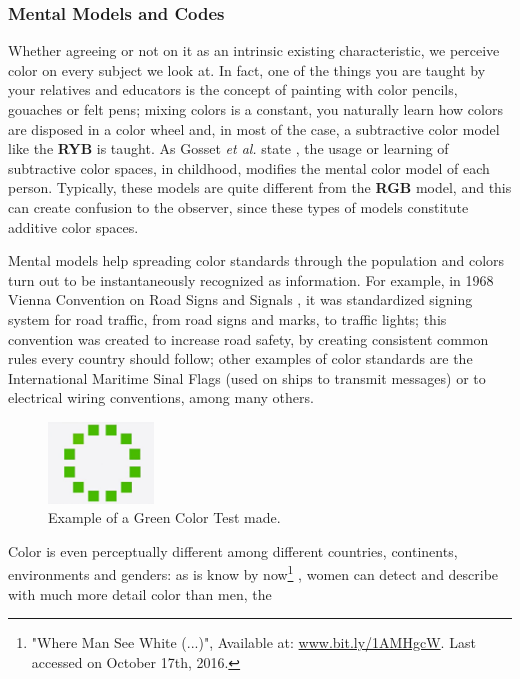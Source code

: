 \subsubsection{Mental Models and Codes}
Whether agreeing or not on it as an intrinsic existing characteristic, we perceive color on every
subject we look at. In fact, one of the things you are taught by your relatives and educators is the concept of
painting with color pencils, gouaches or felt pens; mixing colors is a constant,
you naturally learn how colors are disposed in a color wheel and, in most of the case, a subtractive color
model like the \textbf{RYB} is taught. As Gosset \emph{et al.} state \cite{Gossett2004}, the usage or learning of
subtractive color spaces, in childhood, modifies the mental color model of each person. Typically, these models are quite
different from the \textbf{RGB} model, and this can create confusion to
the observer, since these types of models constitute additive color spaces. \par
Mental models help spreading color standards through the population and colors turn out to be instantaneously
recognized as information. For example, in 1968 Vienna Convention on Road Signs and Signals \cite{Nations1995}, it was standardized signing system for road traffic, from road signs and marks, to traffic lights;
this convention was created to increase road safety, by creating consistent common rules every country
should follow; other examples of color standards are the International Maritime Sinal Flags
\cite{Agency2003} (used on ships to transmit messages) or to electrical wiring conventions, among many others. \par
%
\begin{figure}
	\centering
    \vspace{-10pt}
    \includegraphics[width=0.25\textwidth]{images/background/Himba_green-color-ring.jpg}
    \caption[Himba Test: Green Color Ring]{Example of a Green Color Test made.\protect\footnotemark[8]}
    \label{fig:himba}
\end{figure}
%
Color is even perceptually different among different countries, continents, environments and genders:
as is know by now\footnote{"Where Man See White (...)", Available at:
\url{www.bit.ly/1AMHgcW}.
Last accessed on October 17th, 2016.} \cite{Ginter2011}, women can detect and describe with much more detail color than men, the
